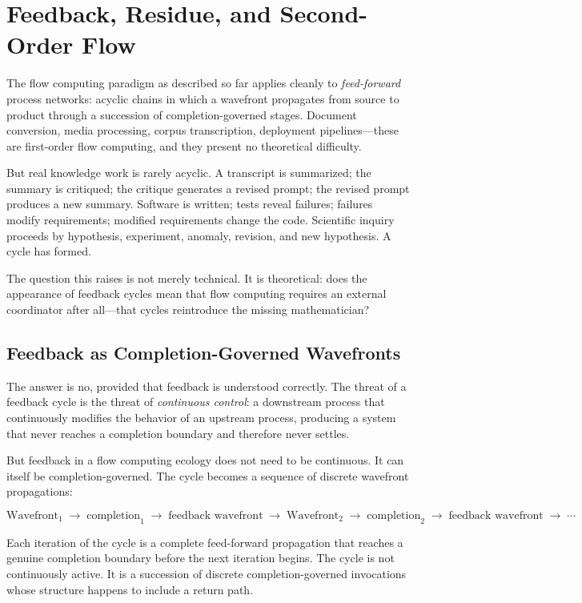 \documentclass[12pt, a4paper]{article}
\begin{document}
\section{Feedback, Residue, and Second-Order Flow}

The flow computing paradigm as described so far applies cleanly to
\emph{feed-forward} process networks: acyclic chains in which a
wavefront propagates from source to product through a succession of
completion-governed stages. Document conversion, media processing,
corpus transcription, deployment pipelines---these are first-order
flow computing, and they present no theoretical difficulty.

But real knowledge work is rarely acyclic. A transcript is
summarized; the summary is critiqued; the critique generates a
revised prompt; the revised prompt produces a new summary. Software
is written; tests reveal failures; failures modify requirements;
modified requirements change the code. Scientific inquiry proceeds
by hypothesis, experiment, anomaly, revision, and new hypothesis.
A cycle has formed.

The question this raises is not merely technical. It is theoretical:
does the appearance of feedback cycles mean that flow computing
requires an external coordinator after all---that cycles reintroduce
the missing mathematician?

\subsection{Feedback as Completion-Governed Wavefronts}

The answer is no, provided that feedback is understood correctly.
The threat of a feedback cycle is the threat of \emph{continuous
control}: a downstream process that continuously modifies the
behavior of an upstream process, producing a system that never
reaches a completion boundary and therefore never settles.

But feedback in a flow computing ecology does not need to be
continuous. It can itself be completion-governed. The cycle becomes
a sequence of discrete wavefront propagations:

\[
\text{Wavefront}_1 \;\to\; \text{completion}_1 \;\to\;
\text{feedback wavefront} \;\to\; \text{Wavefront}_2 \;\to\;
\text{completion}_2 \;\to\; \text{feedback wavefront} \;\to\; \cdots
\]

Each iteration of the cycle is a complete feed-forward propagation
that reaches a genuine completion boundary before the next iteration
begins. The cycle is not continuously active. It is a succession of
discrete completion-governed invocations whose structure happens to
include a return path.
\end{document}

